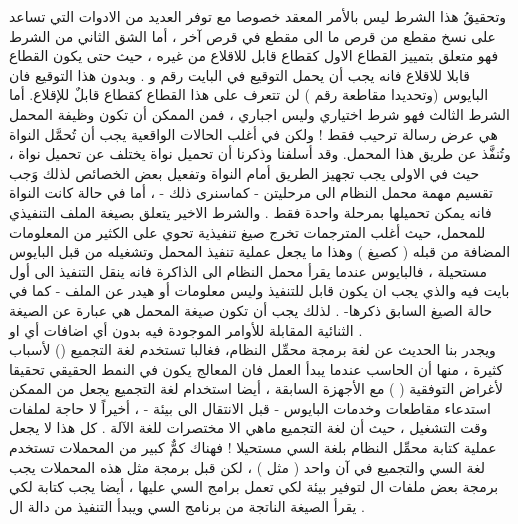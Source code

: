 \documentclass[document.tex]{subfiles}
\begin{document}
وتحقيقُ هذا الشرط ليس بالأمر المعقد خصوصا مع توفر العديد من الادوات التي تساعد على نسخ مقطع من قرص ما الى مقطع في قرص آخر ، أما الشق الثاني من الشرط فهو متعلق بتمييز القطاع الاول كقطاع قابل للاقلاع من غيره ، حيث حتى يكون القطاع قابلا للاقلاع فانه يجب أن يحمل التوقيع  في البايت رقم  و  . وبدون هذا التوقيع فان البايوس (وتحديدا مقاطعة رقم ) لن تتعرف على هذا القطاع كقطاع قابلٌ للإقلاع.
أما الشرط الثالث فهو شرط اختياري وليس اجباري ، فمن الممكن أن تكون وظيفة المحمل هي عرض رسالة ترحيب فقط ! ولكن في أغلب الحالات الواقعية يجب أن تُحمَّل النواة  وتُنفَّذ عن طريق هذا المحمل. وقد أسلفنا وذكرنا أن تحميل نواة  يختلف عن تحميل نواة  ، حيث في الاولى يجب تجهيز الطريق أمام النواة وتفعيل بعض الخصائص لذلك وَجب تقسيم مهمة محمل النظام الى مرحليتن - كماسنرى ذلك - ، أما في حالة كانت النواة  فانه يمكن تحميلها بمرحلة واحدة فقط .
والشرط الاخير يتعلق بصيغة الملف التنفيذي للمحمل، حيث أغلب المترجمات تخرج صيغ تنفيذية تحوي على الكثير من المعلومات المضافة من قبله ( كصيغ  ) وهذا ما يجعل عملية تنفيذ المحمل وتشغيله من قبل البايوس مستحيلة ، فالبايوس عندما يقرأ محمل النظام الى الذاكرة فانه ينقل التنفيذ الى أول بايت فيه والذي يجب ان يكون قابل للتنفيذ وليس معلومات أو هيدر عن الملف - كما في حالة الصيغ السابق ذكرها- . لذلك يجب أن تكون صيغة المحمل هي عبارة عن الصيغة الثنائية المقابلة للأوامر الموجودة فيه بدون أي اضافات أي  او  .\\

ويجدر بنا الحديث عن لغة برمجة محمِّل النظام، فغالبا تستخدم لغة التجميع () لأسباب كثيرة ، منها أن الحاسب عندما يبدأ العمل فان المعالج يكون في النمط الحقيقي تحقيقا لأغراض التوفقية (  ) مع الأجهزة السابقة ، أيضا استخدام لغة التجميع   يجعل من الممكن استدعاء مقاطعات وخدمات البايوس - قبل الانتقال الى بيئة  - ، أخيراً  لا حاجة لملفات وقت التشغيل  ، حيث أن لغة التجميع ماهي الا مختصرات للغة الآلة .
كل هذا لا يجعل عملية كتابة محمِّل النظام بلغة السي مستحيلا ! فهناك كمٌّ كبير من المحملات تستخدم لغة السي والتجميع في آن واحد ( مثل  ) ، لكن قبل برمجة مثل هذه المحملات يجب برمجة بعض ملفات ال  لتوفير بيئة لكي تعمل برامج السي عليها ، أيضا يجب كتابة  لكي يقرأ الصيغة الناتجة من برنامج السي ويبدأ التنفيذ من دالة ال  .
\end{document}
